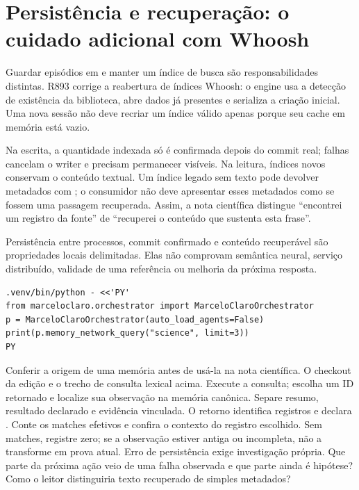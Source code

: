 \section{Persistência e recuperação: o cuidado adicional com Whoosh}

Guardar episódios em  e manter um índice de busca são
responsabilidades distintas. R893 corrige a reabertura de índices Whoosh:
o engine usa a detecção de existência da biblioteca, abre dados já presentes
e serializa a criação inicial. Uma nova sessão não deve recriar um índice
válido apenas porque seu cache em memória está vazio.

Na escrita, a quantidade indexada só é confirmada depois do commit real;
falhas cancelam o writer e precisam permanecer visíveis. Na leitura, índices
novos conservam o conteúdo textual. Um índice legado sem texto pode devolver
metadados com ; o consumidor não deve apresentar
esses metadados como se fossem uma passagem recuperada. Assim, a nota
científica distingue ``encontrei um registro da fonte'' de ``recuperei o
conteúdo que sustenta esta frase''.

\begin{aviso}
Persistência entre processos, commit confirmado e conteúdo recuperável são
propriedades locais delimitadas. Elas não comprovam semântica neural, serviço
distribuído, validade de uma referência ou melhoria da próxima resposta.
\end{aviso}

\begin{verbatim}
.venv/bin/python - <<'PY'
from marceloclaro.orchestrator import MarceloClaroOrchestrator
p = MarceloClaroOrchestrator(auto_load_agents=False)
print(p.memory_network_query("science", limit=3))
PY
\end{verbatim}

\praticacore
{Conferir a origem de uma memória antes de usá-la na nota científica.}
{O checkout da edição e o trecho de consulta lexical acima.}
{Execute a consulta; escolha um ID retornado e localize sua observação na
memória canônica. Separe resumo, resultado declarado e evidência vinculada.}
{O retorno identifica registros e declara .
Conte os matches efetivos e confira o contexto do registro escolhido.}
{Sem matches, registre zero; se a observação estiver antiga ou incompleta,
não a transforme em prova atual. Erro de persistência exige investigação própria.}
{Que parte da próxima ação veio de uma falha observada e que parte ainda é
hipótese? Como o leitor distinguiria texto recuperado de simples metadados?}

